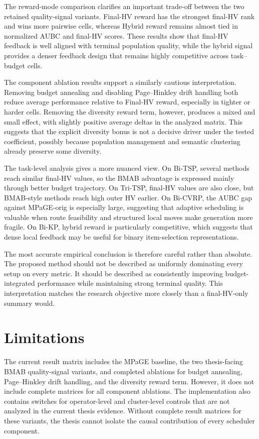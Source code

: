 The reward-mode comparison clarifies an important trade-off between the two retained quality-signal variants. Final-HV reward has the strongest final-HV rank and wins more pairwise cells, whereas Hybrid reward remains almost tied in normalized AUBC and final-HV scores. These results show that final-HV feedback is well aligned with terminal population quality, while the hybrid signal provides a denser feedback design that remains highly competitive across task--budget cells.

The component ablation results support a similarly cautious interpretation. Removing budget annealing and disabling Page--Hinkley drift handling both reduce average performance relative to Final-HV reward, especially in tighter or harder cells. Removing the diversity reward term, however, produces a mixed and small effect, with slightly positive average deltas in the analyzed matrix. This suggests that the explicit diversity bonus is not a decisive driver under the tested coefficient, possibly because population management and semantic clustering already preserve some diversity.

The task-level analysis gives a more nuanced view. On Bi-TSP, several methods reach similar final-HV values, so the BMAB advantage is expressed mainly through better budget trajectory. On Tri-TSP, final-HV values are also close, but BMAB-style methods reach high outer HV earlier. On Bi-CVRP, the AUBC gap against MPaGE-orig is especially large, suggesting that adaptive scheduling is valuable when route feasibility and structured local moves make generation more fragile. On Bi-KP, hybrid reward is particularly competitive, which suggests that dense local feedback may be useful for binary item-selection representations.

The most accurate empirical conclusion is therefore careful rather than absolute. The proposed method should not be described as uniformly dominating every setup on every metric. It should be described as consistently improving budget-integrated performance while maintaining strong terminal quality. This interpretation matches the research objective more closely than a final-HV-only summary would.

\section{Limitations}

The current result matrix includes the MPaGE baseline, the two thesis-facing BMAB quality-signal variants, and completed ablations for budget annealing, Page--Hinkley drift handling, and the diversity reward term. However, it does not include complete matrices for all component ablations. The implementation also contains switches for operator-level and cluster-level controls that are not analyzed in the current thesis evidence. Without complete result matrices for these variants, the thesis cannot isolate the causal contribution of every scheduler component.

